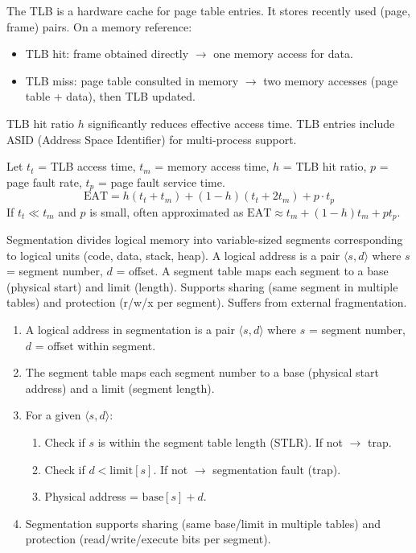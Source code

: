 \documentclass[11pt]{article}
\newcommand{\cle}[1]{{\popxbold\color{popdark}#1}}
\begin{document}
\begin{definition}
The \cle{TLB} is a hardware cache for page table entries. It stores recently used (page, frame) pairs. On a memory reference:
\begin{itemize}
\item \cle{TLB hit}: frame obtained directly $\rightarrow$ one memory access for data.
\item \cle{TLB miss}: page table consulted in memory $\rightarrow$ two memory accesses (page table + data), then TLB updated.
\end{itemize}
TLB hit ratio $h$ significantly reduces effective access time. TLB entries include ASID (Address Space Identifier) for multi-process support.
\end{definition}

\begin{propriete}
Let $t_t$ = TLB access time, $t_m$ = memory access time, $h$ = TLB hit ratio, $p$ = page fault rate, $t_p$ = page fault service time.
\[
\text{EAT} = h(t_t + t_m) + (1-h)(t_t + 2t_m) + p \cdot t_p
\]
If $t_t \ll t_m$ and $p$ is small, often approximated as $\text{EAT} \approx t_m + (1-h)t_m + p t_p$.
\end{propriete}

\begin{definition}[Segmentation]
\cle{Segmentation} divides logical memory into variable-sized \cle{segments} corresponding to logical units (code, data, stack, heap). A logical address is a pair $\langle s, d \rangle$ where $s$ = segment number, $d$ = offset. A \cle{segment table} maps each segment to a \cle{base} (physical start) and \cle{limit} (length). Supports sharing (same segment in multiple tables) and protection (r/w/x per segment). Suffers from external fragmentation.
\end{definition}

\begin{methode}
\begin{enumerate}
\item A logical address in segmentation is a pair $\langle s, d \rangle$ where $s$ = \cle{segment number}, $d$ = \cle{offset within segment}.
\item The \cle{segment table} maps each segment number to a \cle{base} (physical start address) and a \cle{limit} (segment length).
\item For a given $\langle s, d \rangle$:
\begin{enumerate}
\item Check if $s$ is within the segment table length (STLR). If not $\rightarrow$ trap.
\item Check if $d < \text{limit}[s]$. If not $\rightarrow$ \cle{segmentation fault} (trap).
\item Physical address = $\text{base}[s] + d$.
\end{enumerate}
\item Segmentation supports \cle{sharing} (same base/limit in multiple tables) and \cle{protection} (read/write/execute bits per segment).
\end{enumerate}
\end{methode}
\end{document}
